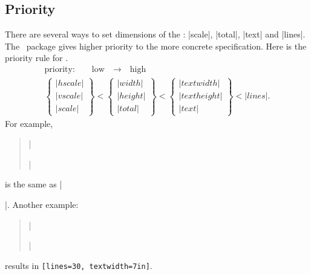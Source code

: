 



 \subsection{Priority}\label{sec:priority}
  
 There are several ways to set dimensions of the :
 |scale|, |total|, |text| and |lines|. The \Gm\ package gives higher
 priority to the more concrete specification. Here is the priority
 rule for .
 \[\begin{array}{c}
 \textrm{priority:}\qquad\textrm{low}\quad
    \longrightarrow\quad\textrm{high}\\[1em]
 \left\{\begin{array}{l}|hscale|\\|vscale|\\|scale|
        \end{array}\right\} <
 \left\{\begin{array}{l}|width|\\|height|\\|total|
        \end{array}\right\} <
 \left\{\begin{array}{l}|textwidth|\\|textheight|
         \\|text|\end{array}\right\} < |lines|.
 \end{array}\]
 For example, 
 \begin{quote}
  |\usepackage[hscale=0.8, textwidth=7in, width=18cm]{geometry}|
 \end{quote}
 is the same as |\usepackage[textwidth=7in]{geometry}|. Another example:
 \begin{quote}
  |\usepackage[lines=30, scale=0.8, text=7in]{geometry}|
 \end{quote}
 results in \texttt{[lines=30, textwidth=7in]}.

